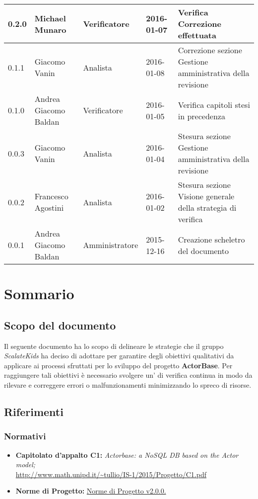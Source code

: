 \documentclass{scalatekids-article}
\begin{document}
\begin{center}
\begin{tabular}{| l | l | l | l | p{5cm} |}
    \hline
    0.2.0 & Michael Munaro & Verificatore & 2016-01-07 & Verifica Correzione effettuata\\
    \hline
    0.1.1 & Giacomo Vanin & Analista & 2016-01-08 & Correzione sezione Gestione amministrativa della revisione\\
    \hline
    0.1.0 & Andrea Giacomo Baldan & Verificatore & 2016-01-05 & Verifica capitoli stesi in precedenza\\
    \hline
    0.0.3 & Giacomo Vanin & Analista & 2016-01-04 & Stesura sezione Gestione amministrativa della revisione\\
    \hline
    0.0.2 & Francesco Agostini & Analista & 2016-01-02 & Stesura sezione Visione generale della strategia di verifica\\
    \hline
    0.0.1 & Andrea Giacomo Baldan & Amministratore & 2015-12-16 & Creazione scheletro del documento\\
    \hline
  \end{tabular}
\end{center}
\tableofcontents
\newpage
{}
\section{Sommario}
\subsection{Scopo del documento}
Il seguente documento ha lo scopo di delineare le strategie che il gruppo \textit{ScalateKids} ha deciso di adottare per garantire degli obiettivi qualitativi da applicare ai processi sfruttati per lo sviluppo del progetto \textbf{ActorBase}. Per raggiungere tali obiettivi è necessario svolgere un' di verifica continua in modo da rilevare e correggere errori o malfunzionamenti minimizzando lo spreco di risorse.
\prodPurpose
\glossExpl
\subsection{Riferimenti}
\subsubsection{Normativi}
\begin{itemize}
\item\textbf{Capitolato d'appalto C1:} \textit{Actorbase: a NoSQL DB based on the Actor model;}\\
  \url{http://www.math.unipd.it/~tullio/IS-1/2015/Progetto/C1.pdf}
\item\textbf{Norme di Progetto:} \href{run:../Interni/NormeDiProgetto\_v2.0.0.pdf}{Norme di Progetto v2.0.0.}
\end{itemize}
\end{document}

